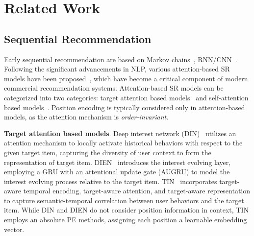 \section{Related Work}
\subsection{Sequential Recommendation} 
Early sequential recommendation are based on Markov chains~\cite{10.1145/2766462.2767694}, RNN/CNN~\cite{hidasi2016sessionbasedrecommendationsrecurrentneural,10.1145/3289600.3290975}. Following the significant advancements in NLP, various attention-based SR models have been proposed~\cite{10.1145/3219819.3219823,10.1609/aaai.v33i01.33015941,kang2018selfattentivesequentialrecommendation,chen2019behaviorsequencetransformerecommerce,10.1145/3340531.3411954,bert4rec}, which have become a critical component of modern commercial recommendation systems. Attention-based SR models can be categorized into two categories: target attention based models~\cite{10.1145/3219819.3219823,10.1609/aaai.v33i01.33015941} and self-attention based models~\cite{kang2018selfattentivesequentialrecommendation,chen2019behaviorsequencetransformerecommerce,10.1145/3340531.3411954,bert4rec,Liu2021NoninvasiveSF}. Position encoding is typically considered only in attention-based models, as the attention mechanism is \textit{order-invariant}.

\textbf{Target attention based models}. Deep interest network (DIN)~\cite{10.1145/3219819.3219823} utilizes an attention mechanism to locally activate historical behaviors with respect to the given target item, capturing the diversity of user context to form the representation of target item. DIEN~\cite{10.1609/aaai.v33i01.33015941} introduces the interest evolving layer, employing a GRU with an attentional update gate (AUGRU) to model the interest evolving process relative to the target item. TIN~\cite{tin} incorporates  target-aware temporal encoding, target-aware attention, and target-aware representation to capture semantic-temporal correlation between user behaviors and the target item. While DIN and DIEN do not consider position information in context, TIN employs an absolute PE methods, assigning each position a learnable embedding vector.

